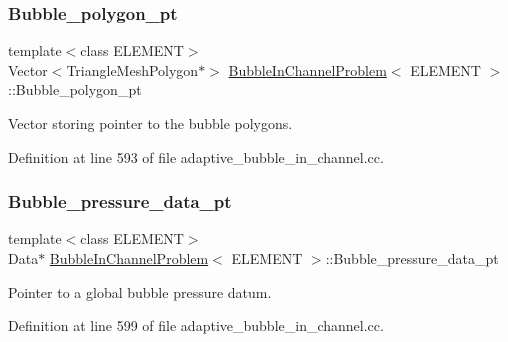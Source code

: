 \subsubsection{\texorpdfstring{Bubble\+\_\+polygon\+\_\+pt}{Bubble\_polygon\_pt}}
{\footnotesize\ttfamily template$<$class E\+L\+E\+M\+E\+NT$>$ \\
Vector$<$Triangle\+Mesh\+Polygon$\ast$$>$ \hyperlink{classBubbleInChannelProblem}{Bubble\+In\+Channel\+Problem}$<$ E\+L\+E\+M\+E\+NT $>$\+::Bubble\+\_\+polygon\+\_\+pt\hspace{0.3cm}{\ttfamily [private]}}



Vector storing pointer to the bubble polygons. 



Definition at line 593 of file adaptive\+\_\+bubble\+\_\+in\+\_\+channel.\+cc.

\mbox{\label{classBubbleInChannelProblem_a88f2b8e5e56219b8e557d8e78fc5b989}} 
\subsubsection{\texorpdfstring{Bubble\+\_\+pressure\+\_\+data\+\_\+pt}{Bubble\_pressure\_data\_pt}}
{\footnotesize\ttfamily template$<$class E\+L\+E\+M\+E\+NT$>$ \\
Data$\ast$ \hyperlink{classBubbleInChannelProblem}{Bubble\+In\+Channel\+Problem}$<$ E\+L\+E\+M\+E\+NT $>$\+::Bubble\+\_\+pressure\+\_\+data\+\_\+pt\hspace{0.3cm}{\ttfamily [private]}}



Pointer to a global bubble pressure datum. 



Definition at line 599 of file adaptive\+\_\+bubble\+\_\+in\+\_\+channel.\+cc.

\mbox{\label{classBubbleInChannelProblem_a1699f6dff44b3d9cb606c7227f5679b7}} 
